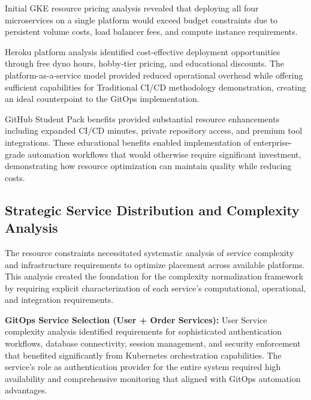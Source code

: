 Initial GKE resource pricing analysis \cite{gcp_pricing2023} revealed that deploying all four microservices on a single platform would exceed budget constraints due to persistent volume costs, load balancer fees, and compute instance requirements.


Heroku platform analysis identified cost-effective deployment opportunities through free dyno hours, hobby-tier pricing, and educational discounts. The platform-as-a-service model provided reduced operational overhead while offering sufficient capabilities for Traditional CI/CD methodology demonstration, creating an ideal counterpoint to the GitOps implementation.

GitHub Student Pack benefits provided substantial resource enhancements including expanded CI/CD minutes, private repository access, and premium tool integrations. These educational benefits enabled implementation of enterprise-grade automation workflows that would otherwise require significant investment, demonstrating how resource optimization can maintain quality while reducing costs.

\subsection{Strategic Service Distribution and Complexity Analysis}

The resource constraints necessitated systematic analysis of service complexity and infrastructure requirements to optimize placement across available platforms. This analysis created the foundation for the complexity normalization framework by requiring explicit characterization of each service's computational, operational, and integration requirements.

\textbf{GitOps Service Selection (User + Order Services):}
User Service complexity analysis identified requirements for sophisticated authentication workflows, database connectivity, session management, and security enforcement that benefited significantly from Kubernetes orchestration capabilities. The service's role as authentication provider for the entire system required high availability and comprehensive monitoring that aligned with GitOps automation advantages.

